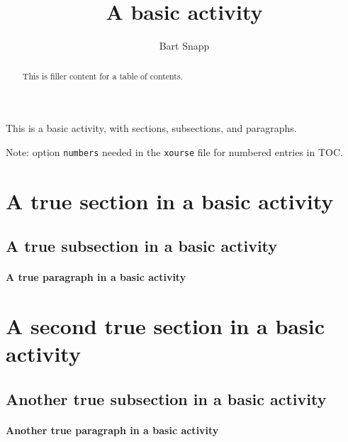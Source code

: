 \documentclass{ximera}
\author{Bart Snapp}
\title{A basic activity}
\begin{document}
\begin{abstract}
    This is filler content for a table of contents.
\end{abstract}
\maketitle

This is a basic activity, with sections, subsections, and paragraphs.


Note: option \verb!numbers! needed in the \verb!xourse! file for numbered entries in TOC.





\section{A true section in a basic activity}
\lipsum[1][1-2]


\subsection{A true subsection in a basic activity}
\lipsum[2][1-2]

\paragraph{A true paragraph in a basic activity}
\lipsum[3][1]


\section{A second true section in a basic activity}
\lipsum[4][1-2]


\subsection{Another true subsection in a basic activity}
\lipsum[1][1-2]

\paragraph{Another true paragraph in a basic activity}
\lipsum[2][1]
\end{document}
